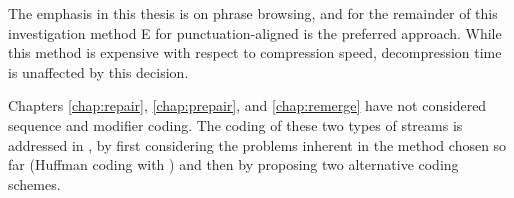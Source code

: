The emphasis in this thesis is on phrase browsing, and for the
remainder of this investigation method E for punctuation-aligned
\repair is the preferred approach.  While this method is expensive
with respect to compression speed, decompression time is unaffected
by this decision.

Chapters \ref{chap:repair}, \ref{chap:prepair}, and \ref{chap:remerge}
have not considered sequence and modifier coding.
The coding of these two types of streams is
addressed in , by first considering the 
problems inherent in the method chosen so far (Huffman coding
with \shuff) and then by proposing two alternative coding 
schemes.  

